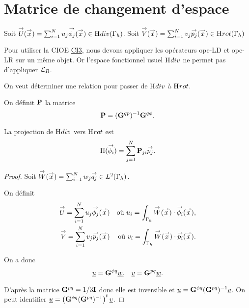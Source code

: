\section{Matrice de changement d'espace}

  Soit \(\vect{U}(\vx) = \sum_{i=1}^N u_j \phij(\vx) \in \Hdiv(\Gamma_h)\).
  Soit \(\vect{V}(\vx) = \sum_{i=1}^N v_j \pj(\vx) \in \Hrot(\Gamma_h)\)  

  Pour utiliser la CIOE \hyperlink{ci3}{CI3}, nous devons appliquer les opérateurs \gls{ope-LD} et \gls{ope-LR} sur un même objet. Or l'espace fonctionnel usuel \(\Hdiv\) ne permet pas d'appliquer \(\LR\). 

  On veut déterminer une relation pour passer de \(\Hdiv\) à \(\Hrot\).

  \begin{defn}On définit \(\mPP\) la matrice
  \label{def:eq_int:matrice_changment_mP}
    \begin{equation*}
      \mPP = (\mG{q}{p})^{-1}\mG{q}{\phi}.
    \end{equation*}
  \end{defn}

  \begin{prop}La projection de \(\Hdiv\) vers \(\Hrot\) est
    \begin{equation*}
      \Pi(\phii) = \sum_{j=1}^N \mPP_{ji}\pj.
    \end{equation*}
  \end{prop}

  \begin{proof}
      Soit \(\vect{W}(\vx) = \sum_{i=1}^N w_j \qj \in L^2(\Gamma_h)\).

      On définit
      \begin{align*}
        \vect{U}= \sum_{i=1}^N u_j \phij(\vx) && \text{où~} u_i = \int_{\Gamma_h} \vect{W}(\vx)\cdot\phii(\vx),
        \\
        \vect{V} = \sum_{i=1}^N v_j \pj(\vx) && \text{où~} v_i = \int_{\Gamma_h} \vect{W}(\vx)\cdot\pii(\vx).
      \end{align*}

      On a donc
      \begin{align*}
        \comp{u}=\mG{\phi}{q}\comp{w},
        &&
        \comp{v}=\mG{p}{q}\comp{w}.
      \end{align*}

      D'après \cite[annexe B]{stupfel_implementation_2015} la matrice \(\mG{p}{q}=1/3\mI\) donc elle est inversible et \(\comp{u} = \mG{\phi}{q} (\mG{p}{q})^{-1} \comp{v}\). On peut identifier \(\comp{u}= \left(\mG{\phi}{q}(\mG{p}{q})^{-1}\right)^{t}\comp{v}\).

    \end{proof}


